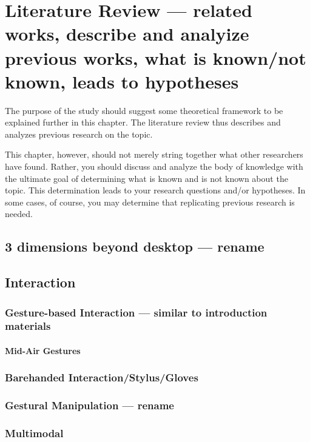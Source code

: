 \chapter{Literature Review --- related works, describe and analyize previous works, what is known/not known, leads to hypotheses}

The purpose of the study should suggest some theoretical framework to be explained further in this chapter.
The literature review thus describes and analyzes previous research on the topic.

 This chapter, however, should not merely string together what other researchers have found. Rather, you
should discuss and analyze the body of knowledge with the ultimate goal of determining what is known and is not
known about the topic. This determination leads to your research questions and/or hypotheses. In some cases, of
course, you may determine that replicating previous research is needed. 

\section{3 dimensions beyond desktop --- rename}

\section{Interaction}

\subsection{Gesture-based Interaction --- similar to introduction materials}

\subsubsection{Mid-Air Gestures}

\subsection{Barehanded Interaction/Stylus/Gloves}

\subsection{Gestural Manipulation --- rename}

\subsection{Multimodal}

